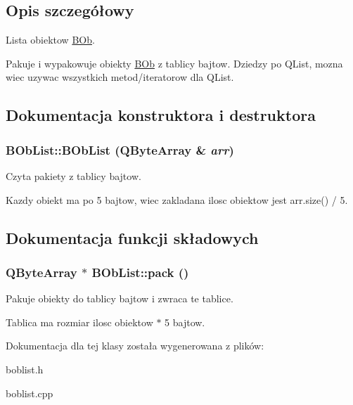 \subsection{Opis szczegółowy}
Lista obiektow \hyperlink{class_b_ob}{BOb}. 

Pakuje i wypakowuje obiekty \hyperlink{class_b_ob}{BOb} z tablicy bajtow. Dziedzy po QList, mozna wiec uzywac wszystkich metod/iteratorow dla QList. 

\subsection{Dokumentacja konstruktora i destruktora}
\hypertarget{class_b_ob_list_f7a55be345796f510a836c0696513f6e}{
\subsubsection[{BObList}]{\setlength{\rightskip}{0pt plus 5cm}BObList::BObList (QByteArray \& {\em arr})}}
\label{class_b_ob_list_f7a55be345796f510a836c0696513f6e}


Czyta pakiety z tablicy bajtow. 

Kazdy obiekt ma po 5 bajtow, wiec zakladana ilosc obiektow jest arr.size() / 5. 

\subsection{Dokumentacja funkcji składowych}
\hypertarget{class_b_ob_list_dfa68bde6e6c3c6641735fb552a76d80}{
\subsubsection[{pack}]{\setlength{\rightskip}{0pt plus 5cm}QByteArray $\ast$ BObList::pack ()}}
\label{class_b_ob_list_dfa68bde6e6c3c6641735fb552a76d80}


Pakuje obiekty do tablicy bajtow i zwraca te tablice. 

Tablica ma rozmiar ilosc obiektow $\ast$ 5 bajtow. 

Dokumentacja dla tej klasy została wygenerowana z plików:\begin{CompactItemize}
\item 
boblist.h\item 
boblist.cpp\end{CompactItemize}

